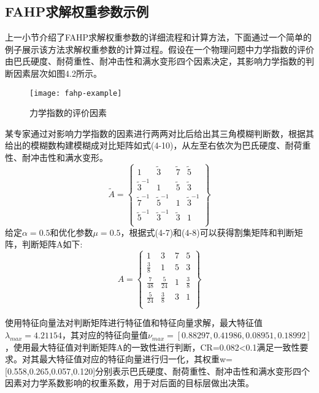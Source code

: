 \subsection{FAHP求解权重参数示例}
上一小节介绍了FAHP求解权重参数的详细流程和计算方法，下面通过一个简单的例子展示该方法求解权重参数的计算过程。假设在一个物理问题中力学指数的评价由巴氏硬度、耐荷重性、耐冲击性和满水变形四个因素决定，其影响力学指数的判断因素层次如图4.2所示。
\begin{figure}[H] %
	\centering
	\texttt{[image: fahp-example]}
	\caption{力学指数的评价因素}
\end{figure}
某专家通过对影响力学指数的因素进行两两对比后给出其三角模糊判断数，根据其给出的模糊数构建模糊成对比矩阵如式(4-10)，从左至右依次为巴氏硬度、耐荷重性、耐冲击性和满水变形。
\begin{equation}
\widetilde{A} = \left\{\begin{array}{cccc}
1 & \widetilde{3} & \widetilde{7} & \widetilde{5}  \\
\widetilde{3}^{-1} & 1 & \widetilde{5} & \widetilde{3} \\
\widetilde{7}^{-1} & \widetilde{5}^{-1} & 1 & \widetilde{3}^{-1} \\
\widetilde{5}^{-1} & \widetilde{3}^{-1} & \widetilde{3} & 1 \\
\end{array}\right\}
\end{equation}
给定$\alpha=0.5$和优化参数$\mu=0.5$，根据式(4-7)和(4-8)可以获得割集矩阵和判断矩阵，判断矩阵A如下:
\begin{equation}
A = \left\{\begin{array}{cccc}
1 & 3 & 7 & 5 \\
\frac{3}{8} & 1 & 5 & 3 \\
\frac{7}{48} & \frac{5}{24} & 1 & \frac{3}{8} \\
\frac{5}{24} & \frac{3}{8} & 3 & 1 \\
\end{array}\right\}
\end{equation}

使用特征向量法对判断矩阵进行特征值和特征向量求解，最大特征值$\lambda_{max}=4.21154$，其对应的特征向量值$\nu_{max}=[0.88297,0.41986,0.08951,0.18992]$，使用最大特征值对判断矩阵A的一致性进行判断，CR=0.082<0.1满足一致性要求。对其最大特征值对应的特征向量进行归一化，其权重w=[0.558,0.265,0.057,0.120]分别表示巴氏硬度、耐荷重性、耐冲击性和满水变形四个因素对力学系数影响的权重系数，用于对后面的目标层做出决策。

